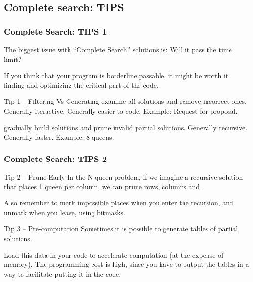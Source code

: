 \documentclass{beamer}
\begin{document}
\subsection{Complete search: TIPS}

\begin{frame}
  \frametitle{Complete Search: TIPS 1}
  The biggest issue with ``Complete Search'' solutions is: Will it
  pass the time limit? 

  \medskip

  If you think that your program is borderline passable, it might be
  worth it finding and optimizing the critical part of the code.

  \vfill

  {\smaller
  \begin{block}{Tip 1 -- Filtering Vs Generating}
     examine all solutions and remove
    incorrect ones. Generally iteractive. Generally easier to
    code. Example: Request for proposal.

    \bigskip

     gradually build solutions and
    prune invalid partial solutions. Generally recursive. Generally
    faster. Example: 8 queens.
  \end{block}}
\end{frame}

\begin{frame}
  \frametitle{Complete Search: TIPS 2}
  {\smaller
    \begin{block}{Tip 2 -- Prune Early}
      In the N queen problem, if we imagine a recursive solution that
      places 1 queen per column, we can prune rows, columns and
      . 

      \smallskip

      Also remember to mark impossible places when you enter the
      recursion, and unmark when you leave, using bitmasks.
    \end{block}

    \vfill

    \begin{block}{Tip 3 -- Pre-computation}
      Sometimes it is possible to generate tables of partial solutions. 

      \medskip

      Load this data in your code to accelerate computation (at the
      expense of memory). The programming cost is high, since you have
      to output the tables in a way to facilitate putting it in the
      code.
    \end{block}

    }
\end{frame}
\end{document}
